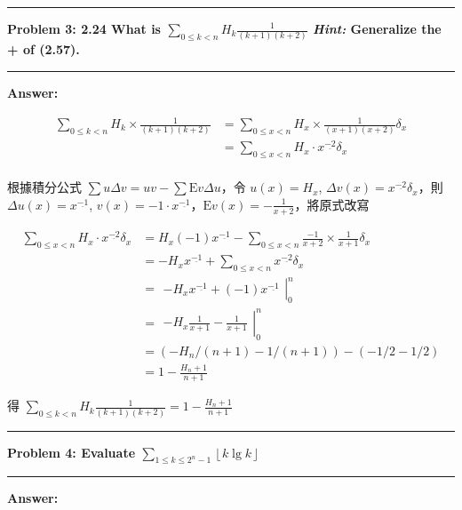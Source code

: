 \documentclass[11pt]{article}
\newcommand\question[2]{\vspace{.25in}\hrule\textbf{#1: #2}\vspace{.5em}\hrule\vspace{.10in}}
\renewcommand\part[1]{\vspace{.10in}\textbf{#1}}
\begin{document}
\question{Problem 3}{2.24 What is $\sum\nolimits_{0 \le k < n} H_k \frac{1}{(k+1)(k+2)}$
	\textit{Hint:} Generalize the + of (2.57).
}

\part{Answer:}

\begin{align*}
	\sum_{0 \le k < n} H_k \times \frac{1}{(k+1)(k+2)} 
		&= \sum_{0 \le x < n} H_x \times \frac{1}{(x+1)(x+2)} \delta_x \\
		&= \sum_{0 \le x < n} H_x \cdot x^{\underline{-2}} \delta_x \\
\end{align*}

根據積分公式 $\sum u \Delta v = uv - \sum \mathrm{E} v \Delta u$，令 $u(x) = H_x$, $\Delta v(x) = x^{\underline{-2}} \delta_x$，則 $\Delta u(x) = x^{\underline{-1}}$, $v(x) = -1 \cdot x^{\underline{-1}}$，$\mathrm{E} v(x) = - \frac{1}{x+2}$，將原式改寫

\begin{align*}
	\sum_{0 \le x < n} H_x \cdot x^{\underline{-2}} \delta_x 
		&= H_x (-1) x^{\underline{-1}} - \sum_{0 \le x < n} \frac{-1}{x+2} \times \frac{1}{x+1} \delta_x \\
		&= - H_x x^{\underline{-1}} + \sum_{0 \le x < n} x^{\underline{-2}} \delta_x \\
		&= \left.\begin{matrix}- H_x x^{\underline{-1}} + (-1) x^{\underline{-1}}\end{matrix}\right|^n_0 \\
		&= \left.\begin{matrix}- H_x \frac{1}{x+1} - \frac{1}{x+1}\end{matrix}\right|^n_0 \\
		&= \left ( - H_n / (n+1) - 1 / (n+1) \right ) - \left ( - 1 / 2 - 1 / 2 \right ) \\
		&= 1 - \frac{H_n + 1}{n+1}
\end{align*}

得 $\sum\nolimits_{0 \le k < n} H_k \frac{1}{(k+1)(k+2)} = 1 - \frac{H_n + 1}{n+1}$

\question{Problem 4}{ Evaluate $\sum_{1 \le k \le 2^n - 1} \left \lfloor k \lg k \right \rfloor$
}

\part{Answer:}
\end{document}
